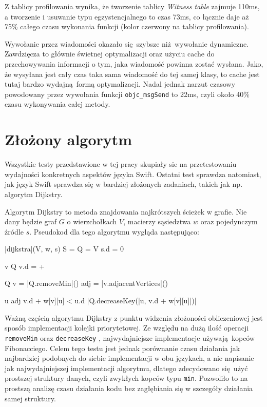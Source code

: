 \documentclass[mgr, shortabstract]{iithesis}
\newcommand{\swiftinline}[1]{
    \texttt{#1}
}
\newcommand{\objcinline}[1]{
    \texttt{#1}
}
\begin{document}
Z tablicy profilowania wynika, że tworzenie tablicy \textit{Witness table} zajmuje 110ms, a tworzenie i usuwanie typu egzystencjalnego to czas 73ms, co łącznie daje aż 75\% całego czasu wykonania funkcji (kolor czerwony na tablicy profilowania).

Wywołanie przez wiadomości okazało się szybsze niż wywołanie dynamiczne. Zawdzięcza to głównie świetnej optymalizacji oraz użyciu cache do przechowywania informacji o tym, jaka wiadomość powinna zostać wysłana. Jako, że wysyłana jest cały czas taka sama wiadomość do tej samej klasy, to cache jest tutaj bardzo wydajną formą optymalizacji. Nadal jednak narzut czasowy powodowany przez wywołania funkcji \objcinline{objc_msgSend} to 22ms, czyli około 40\% czasu wykonywania całej metody.

\section{Złożony algorytm}

Wszystkie testy przedstawione w tej pracy skupiały sie na przetestowaniu wydajności konkretnych aspektów języka Swift. Ostatni test sprawdza natomiast, jak język Swift sprawdza się w bardziej złożonych zadaniach, takich jak np. algorytm Dijkstry.

Algorytm Dijkstry to metoda znajdowania najkrótszych ścieżek w grafie. Nie dany będzie graf $G$ o wierzchołkach $V$, macierzy sąsiedztwa $w$ oraz pojedynczym źródle $s$. Pseudokod dla tego algorytmu wygląda następująco:

\begin{algorithm}
\begin{program}
    \PROC |dijkstra|(V, w, s)
        S = \emptyset {}
        Q = V 
        s.d = 0

        \FOR v \in Q \DO
            v.d = +\infty
        \END

        \WHILE Q \neq \emptyset
            v = |Q.removeMin|()
            adj = |v.adjacentVertices|()

            \FOR u \in adj \DO
                \IF v.d + w[v][u] < u.d
                    \THEN |Q.decreaseKey(|u, v.d + w[v][u]|)|
                \FI
            \END
        \END
\end{program}
\end{algorithm}

Ważną częścią algorytmu Dijkstry z punktu widzenia złożoności obliczeniowej jest sposób implementacji kolejki priorytetowej. Ze względu na dużą ilość operacji \swiftinline{removeMin} oraz \swiftinline{decreaseKey}, najwydajniejsze implementacje używają kopców Fibonacciego. Celem tego testu jest jednak porównanie czasu działania jak najbardziej podobnych do siebie implementacji w obu językach, a nie napisanie jak najwydajniejszej implementacji algorytmu, dlatego zdecydowano się użyć prostszej struktury danych, czyli zwykłych kopców typu \texttt{min}. Pozwoliło to na prostszą analizę czasu działania kodu bez zagłębiania się w szczegóły działania samej struktury.
\end{document}
